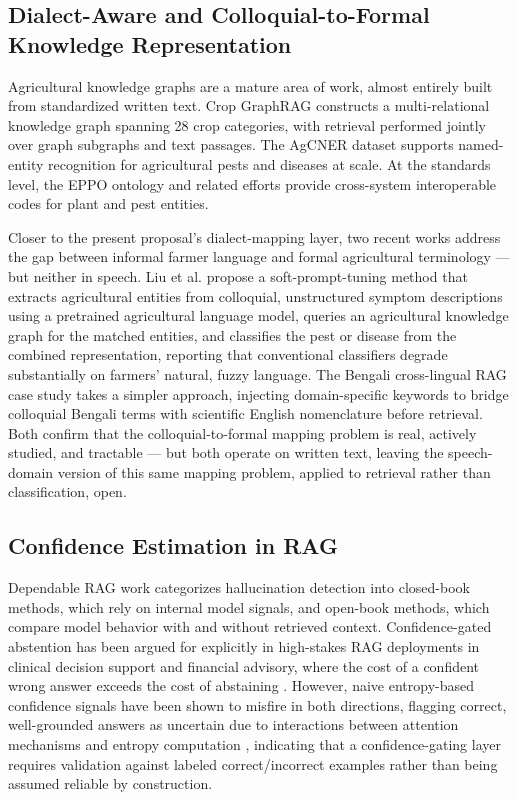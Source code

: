 \documentclass[conference]{IEEEtran}
\begin{document}
\subsection{Dialect-Aware and Colloquial-to-Formal Knowledge Representation}

Agricultural knowledge graphs are a mature area of work, almost entirely built from standardized written text. Crop GraphRAG \cite{wu2026cropgraphrag} constructs a multi-relational knowledge graph spanning 28 crop categories, with retrieval performed jointly over graph subgraphs and text passages. The AgCNER dataset \cite{yao2024agcner} supports named-entity recognition for agricultural pests and diseases at scale. At the standards level, the EPPO ontology and related efforts \cite{kgeditorial2023} provide cross-system interoperable codes for plant and pest entities.

Closer to the present proposal's dialect-mapping layer, two recent works address the gap between informal farmer language and formal agricultural terminology — but neither in speech. Liu et al. \cite{liu2025colloquialpest} propose a soft-prompt-tuning method that extracts agricultural entities from colloquial, unstructured symptom descriptions using a pretrained agricultural language model, queries an agricultural knowledge graph for the matched entities, and classifies the pest or disease from the combined representation, reporting that conventional classifiers degrade substantially on farmers' natural, fuzzy language. The Bengali cross-lingual RAG case study \cite{hossain2026bengalirag} takes a simpler approach, injecting domain-specific keywords to bridge colloquial Bengali terms with scientific English nomenclature before retrieval. Both confirm that the colloquial-to-formal mapping problem is real, actively studied, and tractable — but both operate on written text, leaving the speech-domain version of this same mapping problem, applied to retrieval rather than classification, open.

\subsection{Confidence Estimation in RAG}

Dependable RAG work \cite{dependablerag2026} categorizes hallucination detection into closed-book methods, which rely on internal model signals, and open-book methods, which compare model behavior with and without retrieved context. Confidence-gated abstention has been argued for explicitly in high-stakes RAG deployments in clinical decision support and financial advisory, where the cost of a confident wrong answer exceeds the cost of abstaining \cite{abstinence2025}. However, naive entropy-based confidence signals have been shown to misfire in both directions, flagging correct, well-grounded answers as uncertain due to interactions between attention mechanisms and entropy computation \cite{intrygue2026}, indicating that a confidence-gating layer requires validation against labeled correct/incorrect examples rather than being assumed reliable by construction.
\end{document}
